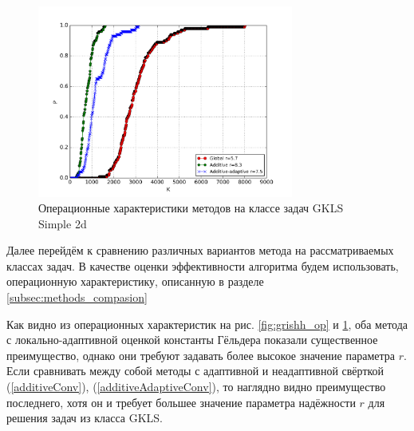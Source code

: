 \begin{figure}[ht]
  \center
  \includegraphics[width=0.75\textwidth]{images/gkls-s.png}
  \caption{Операционные характеристики методов на классе задач GKLS Simple 2d}
  \label{fig:gkls_op}
\end{figure}

Далее перейдём к сравнению различных вариантов метода на рассматриваемых классах задач.
В качестве оценки эффективности алгоритма будем использовать, операционную характеристику,
описанную в разделе \ref{subsec:methods_compasion}

Как видно из операционных характеристик на рис. \ref{fig:grishh_op} и \ref{fig:gkls_op},
оба метода с локально-адаптивной оценкой константы Гёльдера показали существенное преимущество, однако они требуют
задавать более высокое значение параметра \(r\). Если сравнивать между собой методы с
адаптивной и неадаптивной свёрткой (\ref{additiveConv}), (\ref{additiveAdaptiveConv}), то наглядно видно преимущество последнего,
хотя он и требует большее значение параметра надёжности \(r\) для решения задач из класса GKLS.
